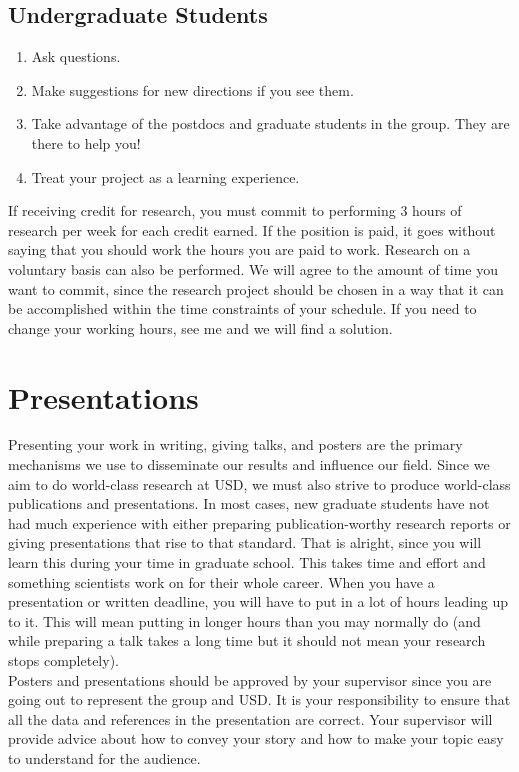 \documentclass[letterpaper]{article}
\begin{document}
\subsection*{Undergraduate Students}

\begin{enumerate}
\item Ask questions.
\item Make suggestions for new directions if you see them.
\item Take advantage of the postdocs and graduate students in the group. They are there to help you! 
\item Treat your project as a learning experience.
\end{enumerate}

If receiving credit for research, you must commit to performing 3 hours of research per week for each credit earned. If the position is paid, it goes without saying that you should work the hours you are paid to work. Research on a voluntary basis can also be performed. We will agree to the amount of time you want to commit, since the research project should be chosen in a way that it can be accomplished within the time constraints of your schedule. If you need to change your working hours, see me and we will find a solution.

\section*{Presentations}
Presenting your work in writing, giving talks, and posters are the primary mechanisms we use to disseminate our results and influence our field. Since we aim to do world-class research at USD, we must also strive to produce world-class publications and presentations. In most cases, new graduate students have not had much experience with either preparing publication-worthy research reports or giving presentations that rise to that standard. That is alright, since you will learn this during your time in graduate school. This takes time and effort and something scientists work on for their whole career. When you have a presentation or written deadline, you will have to put in a lot of hours leading up to it. This will mean putting in longer hours than you may normally do (and while preparing a talk takes a long time but it should not mean your research stops completely).\\

Posters and presentations should be approved by your supervisor since you are going out to represent the group and USD. It is your responsibility to ensure that all the data and references in the presentation are correct. Your supervisor will provide advice about how to convey your story and how to make your topic easy to understand for the audience.
\end{document}
